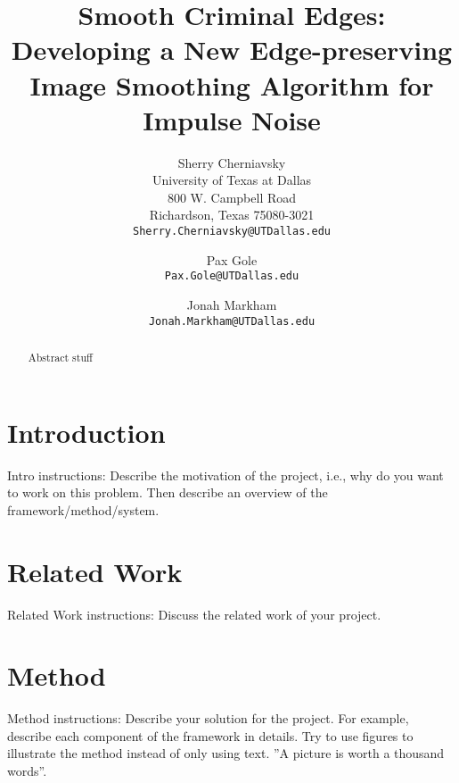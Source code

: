 \documentclass[10pt,twocolumn,letterpaper]{article}
\begin{document}
    \title{Smooth Criminal Edges: Developing a New Edge-preserving Image Smoothing Algorithm for Impulse Noise}

    \author{Sherry Cherniavsky\\
    University of Texas at Dallas\\
    800 W. Campbell Road\\
    Richardson, Texas 75080-3021\\
    {\tt\small Sherry.Cherniavsky@UTDallas.edu}
    \and
    Pax Gole\\
    {\tt\small Pax.Gole@UTDallas.edu}
    \and
    Jonah Markham\\
    {\tt\small Jonah.Markham@UTDallas.edu}
    }
    \maketitle

 \begin{abstract}
    Abstract stuff
 \end{abstract}

    \section{Introduction}
    Intro instructions: Describe the motivation of the project, i.e., why do you want to work on
    this problem. Then describe an overview of the framework/method/system.

    \section{Related Work}
    Related Work instructions: Discuss the related work of your project.

    \section{Method}
    Method instructions: Describe your solution for the project. For example, describe each component of
    the framework in details. Try to use figures to illustrate the method instead of only using
    text. ”A picture is worth a thousand words”.
\end{document}
